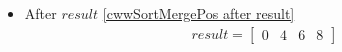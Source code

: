 \begin{frame}[containsverbatim]{\cwwalgortihmexampleframe}
\begin{columns}[c]
\begin{column}{0.65\textwidth}
\begin{multicols}{2}
\begin{itemize}
                            \item After $result$ \cref{cwwSortMergePos after result}
                            \begin{align*}
                                result = \begin{bmatrix}0 & 4 & 6 & 8\end{bmatrix}
                            \end{align*}
                        \end{itemize}
                    \end{multicols}
                \end{column}
            \end{columns}
        \end{frame}

